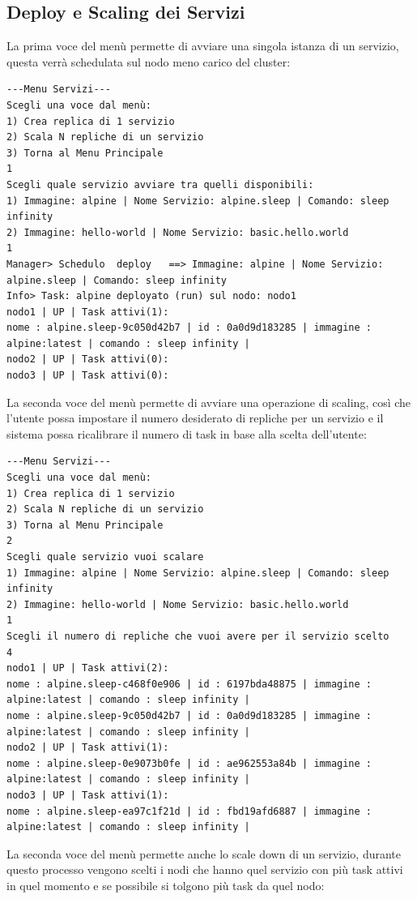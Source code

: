 \documentclass[12pt,a4paper]{article}
\begin{document}
\subsection{Deploy e Scaling dei Servizi}
La prima voce del menù permette di avviare una singola istanza di un servizio, questa verrà schedulata sul nodo meno carico del cluster:
\begin{verbatim}
---Menu Servizi---
Scegli una voce dal menù:
1) Crea replica di 1 servizio
2) Scala N repliche di un servizio
3) Torna al Menu Principale
1
Scegli quale servizio avviare tra quelli disponibili:
1) Immagine: alpine | Nome Servizio: alpine.sleep | Comando: sleep infinity
2) Immagine: hello-world | Nome Servizio: basic.hello.world
1
Manager> Schedulo  deploy   ==> Immagine: alpine | Nome Servizio: alpine.sleep | Comando: sleep infinity
Info> Task: alpine deployato (run) sul nodo: nodo1
nodo1 | UP | Task attivi(1): 
nome : alpine.sleep-9c050d42b7 | id : 0a0d9d183285 | immagine : alpine:latest | comando : sleep infinity | 
nodo2 | UP | Task attivi(0): 
nodo3 | UP | Task attivi(0): 
\end{verbatim}
La seconda voce del menù permette di avviare una operazione di scaling, così che l'utente possa impostare il numero desiderato di repliche per un servizio e il sistema possa ricalibrare il numero di task in base alla scelta dell'utente:
\begin{verbatim}
---Menu Servizi---
Scegli una voce dal menù:
1) Crea replica di 1 servizio
2) Scala N repliche di un servizio
3) Torna al Menu Principale
2
Scegli quale servizio vuoi scalare
1) Immagine: alpine | Nome Servizio: alpine.sleep | Comando: sleep infinity
2) Immagine: hello-world | Nome Servizio: basic.hello.world
1
Scegli il numero di repliche che vuoi avere per il servizio scelto
4
nodo1 | UP | Task attivi(2): 
nome : alpine.sleep-c468f0e906 | id : 6197bda48875 | immagine : alpine:latest | comando : sleep infinity | 
nome : alpine.sleep-9c050d42b7 | id : 0a0d9d183285 | immagine : alpine:latest | comando : sleep infinity | 
nodo2 | UP | Task attivi(1): 
nome : alpine.sleep-0e9073b0fe | id : ae962553a84b | immagine : alpine:latest | comando : sleep infinity | 
nodo3 | UP | Task attivi(1): 
nome : alpine.sleep-ea97c1f21d | id : fbd19afd6887 | immagine : alpine:latest | comando : sleep infinity | 
\end{verbatim}
\newpage
La seconda voce del menù permette anche lo scale down di un servizio, durante questo processo vengono scelti i nodi che hanno quel servizio con più task attivi in quel momento e se possibile si tolgono più task da quel nodo:
\end{document}
